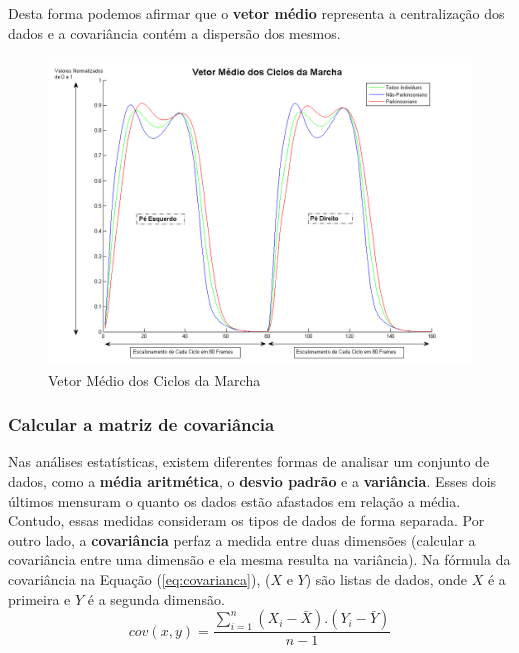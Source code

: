 
Desta forma podemos afirmar que o \textbf{vetor médio} representa a centralização dos dados e a covariância contém a dispersão dos mesmos.

\begin{figure}[!htbp]
 \centering
 \includegraphics[scale=0.50]{./img/vetormediociclosdamarcha.png}
 \caption{Vetor Médio dos Ciclos da Marcha}
 \label{fig:vetor_media_marcha}
\end{figure}


\subsubsection{Calcular a matriz de covariância}

Nas análises estatísticas, existem diferentes formas de analisar um conjunto de dados, como a \textbf{média aritmética}, o \textbf{desvio padrão} e a \textbf{variância}. Esses dois últimos mensuram o quanto os dados estão afastados em relação a média. Contudo, essas medidas consideram os tipos de dados de forma separada. Por outro lado, a \textbf{covariância} perfaz a medida entre duas dimensões (calcular a covariância entre uma dimensão e ela mesma resulta na variância). Na fórmula  da covariância na Equação (\ref{eq:covarianca}), (${X}$ e ${Y}$) são listas de dados, onde ${X}$ é a primeira e ${Y}$ é a segunda dimensão.
\begin{equation}
cov(x,y)=\frac{\sum_{i=1}^{n}(X_{i} - \bar{X}).(Y_{i} - \bar{Y})}{n-1}
\label{eq:covarianca}
\end{equation}

